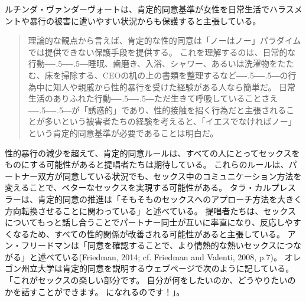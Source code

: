 \documentclass[paper=a4,book,openany]{jlreq}
\newcommand{\ig}[1]{}           %
\def\DDASH{―\kern-.5\zw―\kern-.5\zw―} %
\begin{document}
ルチンダ・ヴァンダーヴォート\ig{Lucinda Vandervort}は、肯定的同意基準が女性を日常生活でハラスメントや暴行の被害に遭いやすい状況からも保護すると主張している。

\begin{quote}
  理論的な観点から言えば、肯定的な性的同意は「ノーはノー」パラダイムでは提供できない保護手段を提供する。
これを理解するのは、日常的な行動{\DDASH}睡眠、歯磨き、入浴、シャワー、あるいは洗濯物をたたむ、床を掃除する、CEOの机の上の書類を整理するなど{\DDASH}の行為中に知人や親戚から性的暴行を受けた経験がある人なら簡単だ。
日常生活のありふれた行動{\DDASH}ただ生きて呼吸していることさえ{\DDASH}が「誘惑的」であり、性的接触を招く行為だと主張されることが多いという被害者たちの経験を考えると、「イエスでなければノー」という肯定的同意基準が必要であることは明白だ。
\citep[p.405]{vandervort12:_affir_sexual_consen_canad_law}
\end{quote}

性的暴行の減少を超えて、肯定的同意ルールは、すべての人にとってセックスをものにする可能性があると提唱者たちは期待している。
これらのルールは、パートナー双方が同意している状況でも、セックス中のコミュニケーション方法を変えることで、ベターなセックスを実現する可能性がある。
タラ・カルプレスラーは、肯定的同意の推進は「そもそものセックスへのアプローチ方法を大きく方向転換させることに関わっている」と述べている。
提唱者たちは、セックスについてもっと話し合うことでパートナー同士が互いに率直になり、反応しやすくなるため、すべての性的関係が改善される可能性があると主張している。
アン・フリードマン\ig{Ann Friedman}は「同意を確認することで、より情熱的な熱いセックスにつながる」と述べている(Friedman, 2014; cf. Friedman and Valenti, 2008, p.7)。
\nocite{friedman14:_oh_yes_means_yes}\nocite{friedman08:_yes_means_yes}
オレゴン州立大学は肯定的同意を説明するウェブページで次のように記している。
「これがセックスの楽しい部分です。
自分が何をしたいのか、どうやりたいのかを話すことができます。
になれるのです！」\citep{moyer14:_how_calif_yes_means_yes}。
\end{document}
